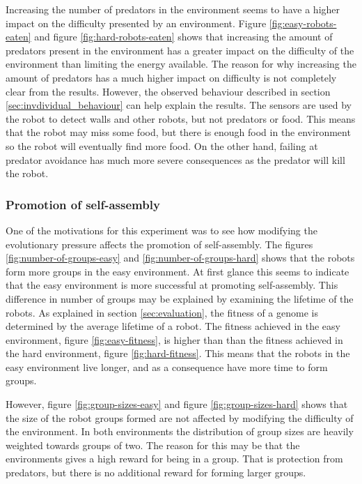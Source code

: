 Increasing the number of predators in the environment seems to have a higher impact on the difficulty presented by an environment.
Figure \ref{fig:easy-robots-eaten} and figure \ref{fig:hard-robots-eaten} shows that increasing the amount of predators present in the environment has a greater impact on the difficulty of the environment than limiting the energy available.
The reason for why increasing the amount of predators has a much higher impact on difficulty is not completely clear from the results.
However, the observed behaviour described in section \ref{sec:invdividual_behaviour} can help explain the results.
The sensors are used by the robot to detect walls and other robots, but not predators or food.
This means that the robot may miss some food, but there is enough food in the environment so the robot will eventually find more food.
On the other hand, failing at predator avoidance has much more severe consequences as the predator will kill the robot.

\subsubsection{Promotion of self-assembly}
One of the motivations for this experiment was to see how modifying the evolutionary pressure affects the promotion of self-assembly.
The figures \ref{fig:number-of-groups-easy} and \ref{fig:number-of-groups-hard} shows that the robots form more groups in the easy environment.
At first glance this seems to indicate that the easy environment is more successful at promoting self-assembly.
This difference in number of groups may be explained by examining the lifetime of the robots.
As explained in section \ref{sec:evaluation}, the fitness of a genome is determined by the average lifetime of a robot.
The fitness achieved in the easy environment, figure \ref{fig:easy-fitness}, is higher than than the fitness achieved in the hard environment, figure \ref{fig:hard-fitness}.
This means that the robots in the easy environment live longer, and as a consequence have more time to form groups.

However, figure \ref{fig:group-sizes-easy} and figure \ref{fig:group-sizes-hard} shows that the size of the robot groups formed are not affected by modifying the difficulty of the environment.
In both environments the distribution of group sizes are heavily weighted towards groups of two.
The reason for this may be that the environments gives a high reward for being in a group.
That is protection from predators, but there is no additional reward for forming larger groups.

